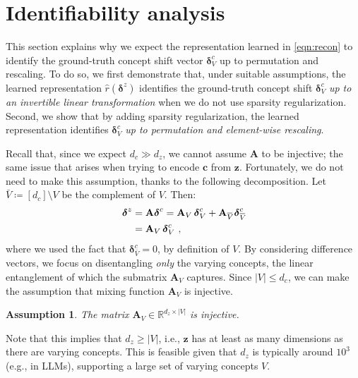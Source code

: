 \documentclass{article}
\newtheorem{assumption}{Assumption}    %
\newcommand{\thickoverline}[1]{%
  \overline{\mathrel{#1}\kern-1.5pt\rule{0pt}{0.5ex}}%
}
\newcommand{\z}{\mathbf{z}}
\newcommand{\A}{\mathbf{A}}
\renewcommand{\c}{\mathbf{c}}
\newcommand{\deltaBold}{\boldsymbol{\delta}}
\newcommand{\deltaz}{\deltaBold^z}
\newcommand{\deltac}{\deltaBold^c}
\begin{document}
\section{Identifiability analysis}
\label{sec:wscrl}
This section explains why we expect the representation learned in \cref{eqn:recon} to identify the ground-truth concept shift vector $\deltac_V$ up to permutation and rescaling. To do so, we first demonstrate that, under suitable assumptions, the learned representation $\hat{r}(\deltaz)$ identifies the ground-truth concept shift $\deltac_V$ \textit{up to an invertible linear transformation} when we do not use sparsity regularization. Second, we show that by adding sparsity regularization, the learned representation identifies $\deltac_V$ \textit{up to permutation and element-wise rescaling}.

Recall that, since we expect $d_c \gg d_z$, we cannot assume $\A$ to be injective; the same issue that arises when trying to encode $\c$ from $\z$. Fortunately, we do not need to make this assumption, thanks to the following decomposition. Let $\bar{V} \coloneqq [d_c] \setminus V$ be the complement of $V$. Then:
\begin{align}
     \deltaz &= \A\deltac 
     = \A_V\, \deltac_V  + \A_{\thickoverline{V}}\, \deltac_{\thickoverline{V}}\nonumber\\
     &= \A_V\, \deltac_V \ ,\label{eqn:diff_model}
\end{align}
where we used the fact that $\deltac_{\bar{V}} = 0$, by definition of $V$. By considering difference vectors, we focus on disentangling \emph{only} the varying concepts, the linear entanglement of which the submatrix $\A_V$ captures. Since $|V| \leq d_c$, we can make the assumption that mixing function $\A_V$ is injective. 
\begin{assumption}\label{ass:injective_Av}
    The matrix $\A_V \in \mathbb{R}^{d_z \times |V|}$ is injective.
    \label{ass:inj}
\end{assumption}
Note that this implies that $d_z \geq |V|$, i.e., $\z$ has at least as many dimensions as there are varying concepts. This is feasible given that $d_z$ is typically around $10^3$ (e.g., in LLMs), supporting a large set of varying concepts $V$. 
\end{document}
